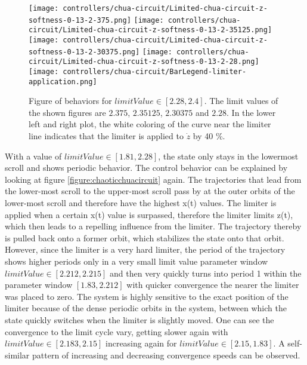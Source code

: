 \documentclass[main]{subfiles}
\begin{document}
\begin{figure}[H]
\centering
\texttt{[image: controllers/chua-circuit/Limited-chua-circuit-z-softness-0-13-2-375.png]}
\texttt{[image: controllers/chua-circuit/Limited-chua-circuit-z-softness-0-13-2-35125.png]}
\texttt{[image: controllers/chua-circuit/Limited-chua-circuit-z-softness-0-13-2-30375.png]}
\texttt{[image: controllers/chua-circuit/Limited-chua-circuit-z-softness-0-13-2-28.png]}
\texttt{[image: controllers/chua-circuit/BarLegend-limiter-application.png]}
\caption[Figure of behaviors for limitValue in 2.28-2.4]{Figure of behaviors for \(limitValue \in [2.28,2.4]\). The limit values of the shown figures are \(2.375\), \(2.35125\), \(2.30375\) and \(2.28\). In the lower left and right plot, the white coloring of the curve near the limiter line indicates that the limiter is applied to \(\dot{z}\) by 40 \%.}
\label{figure:z-2.28-2.4-chaotictrajectories}
\end{figure}

With a value of \(limitValue \in [1.81, 2.28]\), the state only stays in the lowermost scroll and shows periodic behavior. %
%
The control behavior can be explained by looking at figure \ref{figure:chaoticchuacircuit} again. %
%
The trajectories that lead from the lower-most scroll to the upper-most scroll pass by at the outer orbits of the lower-most scroll and therefore have the highest x(t) values. %
%
The limiter is applied when a certain x(t) value is surpassed, therefore the limiter limits z(t), which then leads to a repelling influence from the limiter. %
%
The trajectory thereby is pulled back onto a former orbit, which stabilizes the state onto that orbit. %
%
However, since the limiter is a very hard limiter, the period of the trajectory shows higher periods only in a very small limit value parameter window \(limitValue \in [2.212,2.215]\) and then very quickly turns into period 1 within the parameter window \([1.83,2.212]\) with quicker convergence the nearer the limiter was placed to zero. %
%
The system is highly sensitive to the exact position of the limiter because of the dense periodic orbits in the system, between which the state quickly switches when the limiter is slightly moved. %
%
One can see the convergence to the limit cycle vary, getting slower again with \(limitValue \in [2.183,2.15]\) increasing again for \(limitValue \in [2.15,1.83]\). %
%
A self-similar pattern of increasing and decreasing convergence speeds can be observed.
\end{document}
